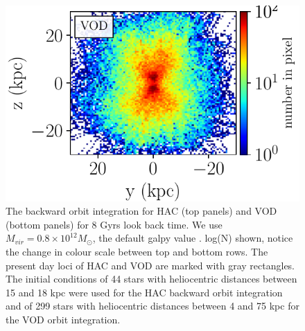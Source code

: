 \documentclass[fleqn,usenatbib]{mnras}
\begin{document}
\begin{figure}
             \includegraphics[scale=0.302]{VOD_orbits_8Gyrs_yz_sausage.pdf}
	     	     	     \vspace{-0.5cm}
   \caption{The backward orbit integration for HAC (top panels) and VOD (bottom panels) for 8 Gyrs look back time. We use $M_{vir} = 0.8 \times 10^{12} M_{\odot}$, the default galpy value . log(N) shown, notice the change in colour scale between top and bottom rows. The present day loci of  HAC and VOD are marked with gray rectangles. The initial conditions of 44 stars with heliocentric distances between 15 and 18 kpc were used for the HAC backward orbit integration and of 299 stars with heliocentric distances between 4 and 75 kpc for the VOD orbit integration.}
    \label{fig:backorbits}
\end{figure}
%
%
\end{document}

